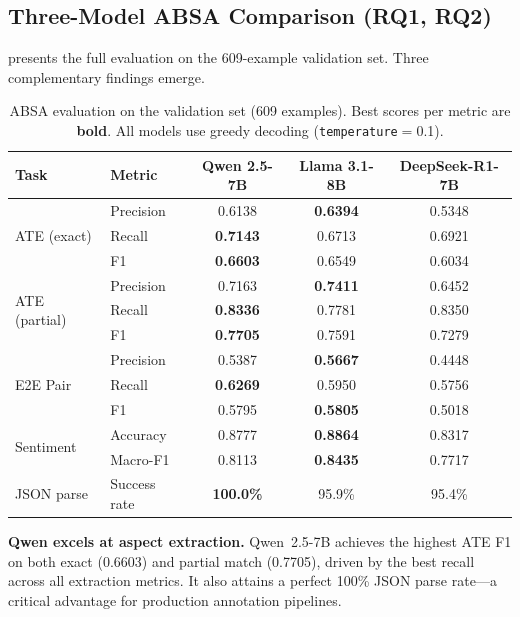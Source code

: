 \documentclass[computers,article,submit,pdftex,moreauthors]{Definitions/mdpi}
\begin{document}
\subsection{Three-Model ABSA Comparison (RQ1, RQ2)}
\label{sec:res_comparison}

 presents the full evaluation on the 609-example validation set. Three complementary findings emerge.

\begin{table}[t]
\centering
\caption{ABSA evaluation on the validation set (609 examples). Best scores per metric are \textbf{bold}. All models use greedy decoding (\texttt{temperature}$=$0.1).}
\label{tab:absa_results}
\setlength{\tabcolsep}{3.5pt}
\begin{tabular}{llccc}
\toprule
\textbf{Task} & \textbf{Metric} & \textbf{Qwen 2.5-7B} & \textbf{Llama 3.1-8B} & \textbf{DeepSeek-R1-7B} \\
\midrule
\multirow{3}{*}{ATE (exact)}
  & Precision & 0.6138 & \textbf{0.6394} & 0.5348 \\
  & Recall    & \textbf{0.7143} & 0.6713 & 0.6921 \\
  & F1        & \textbf{0.6603} & 0.6549 & 0.6034 \\
\midrule
\multirow{3}{*}{ATE (partial)}
  & Precision & 0.7163 & \textbf{0.7411} & 0.6452 \\
  & Recall    & \textbf{0.8336} & 0.7781 & 0.8350 \\
  & F1        & \textbf{0.7705} & 0.7591 & 0.7279 \\
\midrule
\multirow{3}{*}{E2E Pair}
  & Precision & 0.5387 & \textbf{0.5667} & 0.4448 \\
  & Recall    & \textbf{0.6269} & 0.5950 & 0.5756 \\
  & F1        & 0.5795 & \textbf{0.5805} & 0.5018 \\
\midrule
\multirow{2}{*}{Sentiment}
  & Accuracy  & 0.8777 & \textbf{0.8864} & 0.8317 \\
  & Macro-F1  & 0.8113 & \textbf{0.8435} & 0.7717 \\
\midrule
JSON parse & Success rate & \textbf{100.0\%} & 95.9\% & 95.4\% \\
\bottomrule
\end{tabular}
\end{table}

\textbf{Qwen excels at aspect extraction.} Qwen~2.5-7B achieves the highest ATE F1 on both exact (0.6603) and partial match (0.7705), driven by the best recall across all extraction metrics. It also attains a perfect 100\% JSON parse rate---a critical advantage for production annotation pipelines.
\end{document}
